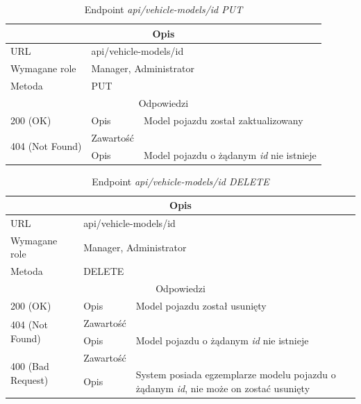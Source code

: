 \documentclass[eng,printmode,openany]{mgr}
\begin{document}
\begin{table}[H]
	\caption{Endpoint \textit{api/vehicle-models/id PUT}}
	\begin{tabularx}{\textwidth}{|l|l|X|}
		\hline
		\multicolumn{3}{|c|}{Opis}
		\\ \hline
		URL                       & \multicolumn{2}{l|}{api/vehicle-models/id}
		\\ \hline
		Wymagane role             & \multicolumn{2}{l|}{Manager, Administrator}
		\\ \hline
		Metoda                    & \multicolumn{2}{l|}{PUT}
		\\ \hline
		\multicolumn{3}{|c|}{Odpowiedzi}
		\\ \hline
		200 (OK) 		 & Opis      	& Model pojazdu został zaktualizowany
		\\ \hline
		\multirow{2}{*}{404 (Not Found)} 	    & Zawartość     &   
		\\ \cline{2-3}                          & Opis          & Model pojazdu o żądanym \textit{id} nie istnieje
		\\ \hline
	\end{tabularx}
\end{table}

\begin{table}[H]
\caption{Endpoint \textit{api/vehicle-models/id DELETE}}
	\begin{tabularx}{\textwidth}{|l|l|X|}
		\hline
		\multicolumn{3}{|c|}{Opis}
		\\ \hline
		URL                       & \multicolumn{2}{l|}{api/vehicle-models/id}
		\\ \hline
		Wymagane role             & \multicolumn{2}{l|}{Manager, Administrator}
		\\ \hline
		Metoda                    & \multicolumn{2}{l|}{DELETE}
		\\ \hline
		\multicolumn{3}{|c|}{Odpowiedzi}
		\\ \hline
		200 (OK)			                & Opis         	& Model pojazdu został usunięty
		\\ \hline
		\multirow{2}{*}{404 (Not Found)} 	& Zawartość     &    	
		\\ \cline{2-3}                      & Opis          & Model pojazdu o żądanym \textit{id} nie istnieje
		\\ \hline
		\multirow{2}{*}{400 (Bad Request)} 	& Zawartość     &    	
		\\ \cline{2-3}                      & Opis          & System posiada egzemplarze modelu pojazdu o żądanym \textit{id}, nie może on zostać usunięty
		\\ \hline
	\end{tabularx}
\end{table}
\end{document}
